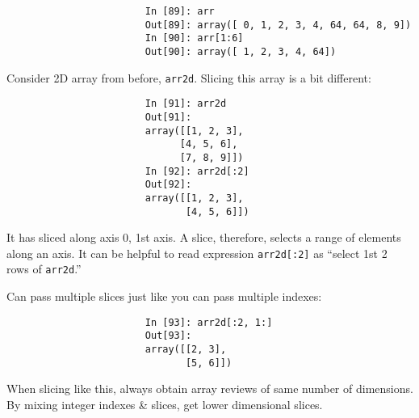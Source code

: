 \documentclass{article}
\begin{document}
\begin{enumerate}
\begin{itemize}
\begin{itemize}
\begin{itemize}
\begin{itemize}
\begin{verbatim}
						In [89]: arr
						Out[89]: array([ 0, 1, 2, 3, 4, 64, 64, 8, 9])
						In [90]: arr[1:6]
						Out[90]: array([ 1, 2, 3, 4, 64])
					\end{verbatim}
					Consider 2D array from before, {\tt arr2d}. Slicing this array is a bit different:
					\begin{verbatim}
						In [91]: arr2d
						Out[91]:
						array([[1, 2, 3],
						      [4, 5, 6],
						      [7, 8, 9]])
						In [92]: arr2d[:2]
						Out[92]:
						array([[1, 2, 3],
						       [4, 5, 6]])
					\end{verbatim}
					It has sliced along axis 0, 1st axis. A slice, therefore, selects a range of elements along an axis. It can be helpful to read expression {\tt arr2d[:2]} as ``select 1st 2 rows of {\tt arr2d}.''
					
					Can pass multiple slices just like you can pass multiple indexes:
					\begin{verbatim}
						In [93]: arr2d[:2, 1:]
						Out[93]:
						array([[2, 3],
						       [5, 6]])
					\end{verbatim}
					When slicing like this, always obtain array reviews of same number of dimensions. By mixing integer indexes \& slices, get lower dimensional slices.
				

\end{itemize}
\end{itemize}
\end{itemize}
\end{itemize}
\end{enumerate}
\end{document}
